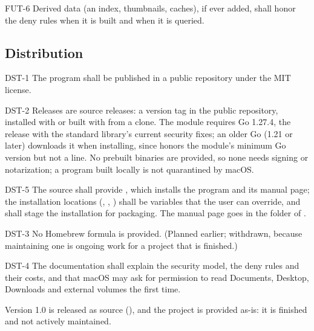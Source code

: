 \begin{req}{FUT-6}
Derived data (an index, thumbnails, caches), if ever added, shall honor the deny
rules when it is built and when it is queried.
\end{req}

\subsection{Distribution}

\begin{req}{DST-1}
The program shall be published in a public repository under the MIT license.
\end{req}

\begin{req}{DST-2}
Releases are source releases: a version tag in the public repository, installed with
 or built with  from a clone.  The module requires Go 1.27.4, the release with the
standard library's current security fixes; an older Go (1.21 or later) downloads it
when installing, since  honors the module's minimum Go version but
not a  line.  No prebuilt binaries are provided, so none needs signing or
notarization; a program built locally is not quarantined by macOS.
\end{req}

\begin{req}{DST-5}
The source shall provide , which installs the program and its manual
page; the installation locations (, , ) shall be
variables that the user can override, and  shall stage the installation for
packaging.  The manual page goes in the  folder of .
\end{req}

\begin{req}{DST-3}
No Homebrew formula is provided.  (Planned earlier; withdrawn, because maintaining
one is ongoing work for a project that is finished.)
\end{req}

\begin{req}{DST-4}
The documentation shall explain the security model, the deny rules and their costs,
and that macOS may ask for permission to read Documents, Desktop, Downloads and
external volumes the first time.
\end{req}

Version 1.0 is released as source (), and the project is provided as-is: it
is finished and not actively maintained.
